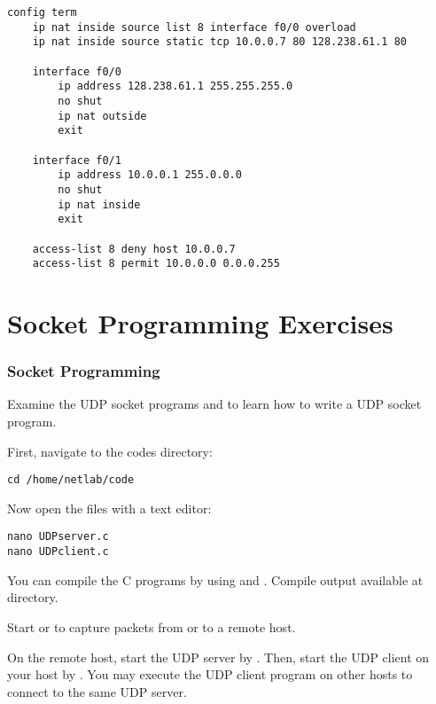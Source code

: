 \documentclass{../UTNetLab}
\begin{document}
\begin{lstlisting}[language={cisco}, caption={PAT Router Configuration in \hyperref[fig:8.7]{Figure~8.7} (Table~8.6)\label{tab:8.6}}]
config term
    ip nat inside source list 8 interface f0/0 overload
    ip nat inside source static tcp 10.0.0.7 80 128.238.61.1 80

    interface f0/0
        ip address 128.238.61.1 255.255.255.0
        no shut
        ip nat outside
        exit

    interface f0/1
        ip address 10.0.0.1 255.0.0.0
        no shut
        ip nat inside
        exit

    access-list 8 deny host 10.0.0.7
    access-list 8 permit 10.0.0.0 0.0.0.255
\end{lstlisting}

\part{Socket Programming Exercises}
\section{Socket Programming}
Examine the UDP socket programs  and  to learn how to write a UDP socket program.

First, navigate to the codes directory:

\begin{lstlisting}
cd /home/netlab/code
\end{lstlisting}

Now open the files with a text editor:

\begin{lstlisting}
nano UDPserver.c
nano UDPclient.c
\end{lstlisting}

You can compile the C programs by using  and .
Compile output available at  directory.

Start  or  to capture packets from or to a remote host.

On the remote host, start the UDP server by .
Then, start the UDP client on your host by .
You may execute the UDP client program on other hosts to connect to the same UDP server.
\end{document}
